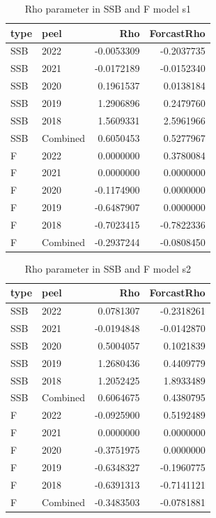 \documentclass[
]{article}
\begin{document}
\begin{table}[H]

\caption{\label{tab:unnamed-chunk-14}\label{mod1}Rho parameter in SSB and F model s1}
\centering
\begin{tabular}[t]{llrr}
\toprule
type & peel & Rho & ForcastRho\\
\midrule
SSB & 2022 & -0.0053309 & -0.2037735\\
SSB & 2021 & -0.0172189 & -0.0152340\\
SSB & 2020 & 0.1961537 & 0.0138184\\
SSB & 2019 & 1.2906896 & 0.2479760\\
SSB & 2018 & 1.5609331 & 2.5961966\\
\addlinespace
SSB & Combined & 0.6050453 & 0.5277967\\
F & 2022 & 0.0000000 & 0.3780084\\
F & 2021 & 0.0000000 & 0.0000000\\
F & 2020 & -0.1174900 & 0.0000000\\
F & 2019 & -0.6487907 & 0.0000000\\
\addlinespace
F & 2018 & -0.7023415 & -0.7822336\\
F & Combined & -0.2937244 & -0.0808450\\
\bottomrule
\end{tabular}
\end{table}

\begin{table}[H]

\caption{\label{tab:unnamed-chunk-14}\label{mod2}Rho parameter in SSB  and F model s2}
\centering
\begin{tabular}[t]{llrr}
\toprule
type & peel & Rho & ForcastRho\\
\midrule
SSB & 2022 & 0.0781307 & -0.2318261\\
SSB & 2021 & -0.0194848 & -0.0142870\\
SSB & 2020 & 0.5004057 & 0.1021839\\
SSB & 2019 & 1.2680436 & 0.4409779\\
SSB & 2018 & 1.2052425 & 1.8933489\\
\addlinespace
SSB & Combined & 0.6064675 & 0.4380795\\
F & 2022 & -0.0925900 & 0.5192489\\
F & 2021 & 0.0000000 & 0.0000000\\
F & 2020 & -0.3751975 & 0.0000000\\
F & 2019 & -0.6348327 & -0.1960775\\
\addlinespace
F & 2018 & -0.6391313 & -0.7141121\\
F & Combined & -0.3483503 & -0.0781881\\
\bottomrule
\end{tabular}
\end{table}
\end{document}
